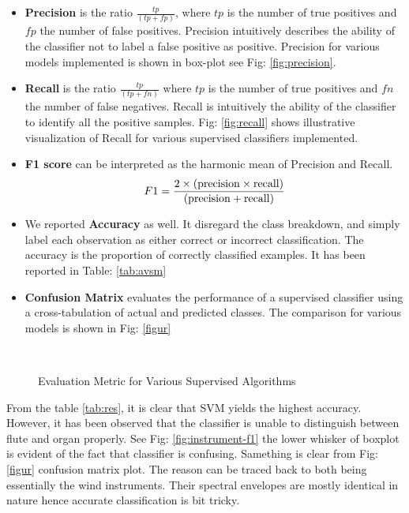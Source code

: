 \documentclass[conference]{IEEEtran}
\begin{document}
\begin{itemize}
	\item \textbf{Precision} is the ratio $\frac{tp}{(tp + fp)}$, where $tp$ is the number of true positives and $fp$ the number of false positives. Precision intuitively describes the ability of the classifier not to label a false positive as positive. Precision for various models implemented is shown in box-plot see Fig: \ref{fig:precision}. 
	
	\item \textbf{Recall} is the ratio $\frac{tp}{(tp + fn)}$ where $tp$ is the number of true positives and $fn$ the number of false negatives. Recall is intuitively the ability of the classifier to identify all the positive samples. Fig: \ref{fig:recall} shows illustrative visualization of Recall for various supervised classifiers implemented. 
	
	\item \textbf{F1 score} can be interpreted as the harmonic mean of Precision and Recall. $$F1 = \frac{2 \times (\rm{precision} \times \rm{recall})}{ (\rm{precision} + \rm{recall})}$$
	
	\item We reported \textbf{Accuracy} as well. It disregard the class breakdown, and simply label each observation as either correct or incorrect classification. The accuracy is the proportion of correctly classified examples. It has been reported in Table: \ref{tab:avsm}
	\item \textbf{Confusion Matrix} evaluates the performance of a supervised classifier using a cross-tabulation of actual and predicted classes. The comparison for various models is shown in Fig: \ref{figur}
\end{itemize}

\begin{figure*}[ht]
	\centering
	
	\\
	\caption{Evaluation Metric for Various Supervised Algorithms}
\end{figure*}

From the table \ref{tab:res}, it is clear that SVM yields the highest accuracy. However, it has been observed that the classifier is unable to distinguish between flute and organ properly. See Fig: \ref{fig:instrument-f1} the lower whisker of boxplot is evident of the fact that classifier is confusing. Samething is clear from Fig: \ref{figur} confusion matrix plot. The reason can be traced back to both being essentially the wind instruments. Their spectral envelopes are mostly identical in nature hence accurate classification is bit tricky. 
\end{document}
